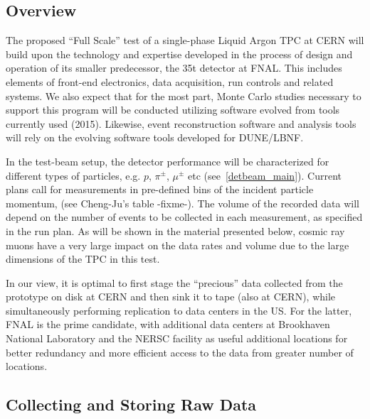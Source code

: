 
\subsection{Overview}
The proposed ``Full Scale'' test of a single-phase Liquid Argon TPC at CERN will build upon the technology and expertise developed in the
process of design and operation of its smaller predecessor, the 35t detector at FNAL.
This includes elements of front-end electronics, data acquisition, run controls and related systems. We also expect that for the most part,
Monte Carlo studies necessary to support this program will be conducted utilizing software evolved from tools currently used (2015). Likewise,
event reconstruction software and analysis tools will rely on the evolving software tools developed for DUNE/LBNF.

In the test-beam setup, the detector performance will be characterized for different types of particles,
e.g. $p$, $\pi^{\pm}$, $\mu^{\pm}$ etc (see~\ref{detbeam_main}).
Current plans call for measurements in pre-defined bins of the incident particle momentum, (see Cheng-Ju's table -fixme-). The volume of the recorded data  will depend on the number of events to be collected in each measurement,
as specified in the run plan. As will be shown in the material presented below, cosmic ray muons have a very large impact on the data rates and
volume due to the large dimensions of the TPC in this test.

In our view, it is optimal to first stage the ``precious'' data collected from the prototype on disk at CERN and then sink it to tape (also at CERN),
while simultaneously performing replication to data centers in the US. For the latter, FNAL is the prime candidate, with additional data centers at Brookhaven National Laboratory
and the NERSC facility as useful additional locations for better redundancy and more efficient access to the data from greater number of locations.

\subsection{Collecting and Storing Raw Data}

